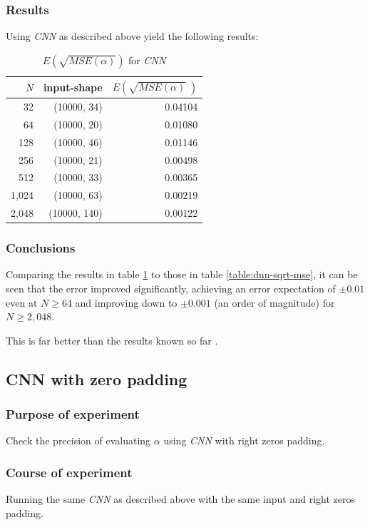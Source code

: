 \documentclass[a4paper, 12pt]{report}
\begin{document}
\subsubsection{Results}
Using \textit{CNN} as described above yield the following results:

\begin{table}[h!]
    \centering
    \begin{tabular}{r r r} 
        $N$ & input-shape & $E\left(\sqrt{MSE(\alpha)}\;\right)$ \\
        \hline
        32 & (10000, 34) & 0.04104 \\ 
        \rowcolor{yellow}
        64 & (10000, 20) & 0.01080 \\
        128 & (10000, 46) & 0.01146 \\
        256 & (10000, 21) & 0.00498 \\
        512 & (10000, 33) & 0.00365 \\ 
        1,024 & (10000, 63) & 0.00219 \\ 
        \rowcolor{yellow}
        2,048 & (10000, 140) & 0.00122 \\ 
    \end{tabular}
    \caption{$E\left(\sqrt{MSE(\alpha)}\right)$ for \textit{CNN}}
    \label{table:cnn-sqrt-mse}
\end{table}

\subsubsection{Conclusions}
Comparing the results in table \ref{table:cnn-sqrt-mse} to those in table \ref{table:dnn-sqrt-mse}, it can be seen that the error improved significantly, achieving an error expectation of $\pm 0.01$ even at $N \geq 64$ and improving down to $\pm 0.001$ (an order of magnitude) for $N \geq 2,048$.

This is far better than the results known so far \cite{newman}.

\subsection{CNN with zero padding}
\subsubsection{Purpose of experiment}
Check the precision of evaluating $\alpha$ using \textit{CNN} with right zeros padding.

\subsubsection{Course of experiment}
Running the same \textit{CNN} as described above with the same input and right zeros padding.
\end{document}
